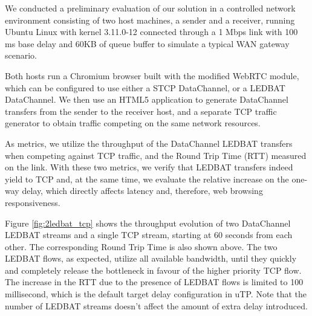\documentclass{sig-alternate}
\begin{document}
\label{sec:architecture}



We conducted a preliminary evaluation of our solution in a controlled network environment
consisting of two host machines, a sender and a receiver, running Ubuntu Linux with kernel
3.11.0-12 connected through a 1 Mbps link with 100 ms base delay and 60KB of queue
buffer to simulate a typical WAN gateway scenario.

%

Both hosts run a Chromium browser built with the modified WebRTC module, which can be configured to use either a STCP DataChannel, or a LEDBAT DataChannel. We then use an HTML5 application to generate DataChannel transfers from the sender to the receiver host, and a separate TCP traffic generator to obtain traffic competing on the same network resources.

As metrics, we utilize the throughput of the DataChannel LEDBAT transfers when competing
against TCP traffic, and the Round Trip Time (RTT) measured on the link. With these two
metrics, we verify that LEDBAT transfers indeed yield to TCP and, at the same time, we
evaluate the relative increase on the one-way delay, which directly affects latency and,
therefore, web browsing responsiveness.

Figure \ref{fig:2ledbat_tcp} shows the throughput evolution of two DataChannel LEDBAT
streams and a single TCP stream, starting at 60 seconds from each other. The corresponding
Round Trip Time is also shown above. The two LEDBAT flows, as expected, utilize all
available bandwidth, until they quickly and completely release the bottleneck in favour of
the higher priority TCP flow. The increase in the RTT due to the presence of LEDBAT flows
is limited to 100 millisecond, which is the default target delay configuration in
uTP. Note that the number of LEDBAT streams doesn't affect the amount of extra delay
introduced.
\end{document}
